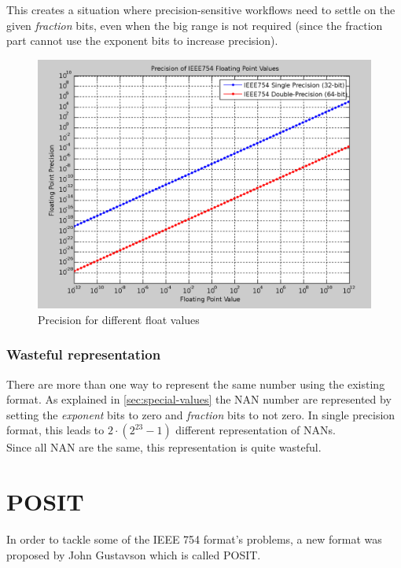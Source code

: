\documentclass[10pt]{article}
\begin{document}
This creates a situation where precision-sensitive workflows need to settle on
the given \textit{fraction} bits, even when the big range is not required (since
the fraction part cannot use the exponent bits to increase precision).

\begin{figure}[h]
  \centering
  \includegraphics[width=\textwidth, height=0.3\paperheight]{1280px-IEEE754}
  \caption{Precision for different float values}\label{prec_value}
\end{figure}

\subsubsection{Wasteful representation}\label{sec:wast-repr}

There are more than one way to represent the same number using the existing
format. As explained in \autoref{sec:special-values} the NAN number are
represented by setting the \textit{exponent} bits to zero and \textit{fraction}
bits to not zero. In single precision format, this leads to
$2\cdot (2^{23} - 1)$ different representation of NANs. \\
Since all NAN are the same, this representation is quite wasteful.

\section{POSIT}\label{sec:posit}

In order to tackle some of the IEEE 754 format's problems, a new format was
proposed by John Gustavson which is called POSIT\cite{gustavson}.\@
\end{document}
